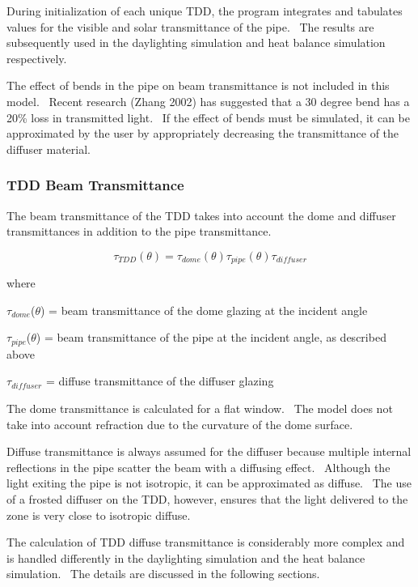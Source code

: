 During initialization of each unique TDD, the program integrates and tabulates values for the visible and solar transmittance of the pipe.~ The results are subsequently used in the daylighting simulation and heat balance simulation respectively.

The effect of bends in the pipe on beam transmittance is not included in this model.~ Recent research (Zhang 2002) has suggested that a 30 degree bend has a 20\% loss in transmitted light.~ If the effect of bends must be simulated, it can be approximated by the user by appropriately decreasing the transmittance of the diffuser material.

\subsubsection{TDD Beam Transmittance}\label{tdd-beam-transmittance}

The beam transmittance of the TDD takes into account the dome and diffuser transmittances in addition to the pipe transmittance.

\begin{equation}
{\tau_{TDD}}(\theta ) = {\tau_{dome}}(\theta ){\tau_{pipe}}(\theta ){\tau_{diffuser}}
\end{equation}

where

\(\tau_{dome}\)(\(\theta\)) = beam transmittance of the dome glazing at the incident angle

\(\tau_{pipe}\)(\(\theta\)) = beam transmittance of the pipe at the incident angle, as described above

\(\tau_{diffuser}\) = diffuse transmittance of the diffuser glazing

The dome transmittance is calculated for a flat window.~ The model does not take into account refraction due to the curvature of the dome surface.

Diffuse transmittance is always assumed for the diffuser because multiple internal reflections in the pipe scatter the beam with a diffusing effect.~ Although the light exiting the pipe is not isotropic, it can be approximated as diffuse.~ The use of a frosted diffuser on the TDD, however, ensures that the light delivered to the zone is very close to isotropic diffuse.

The calculation of TDD diffuse transmittance is considerably more complex and is handled differently in the daylighting simulation and the heat balance simulation.~ The details are discussed in the following sections.

